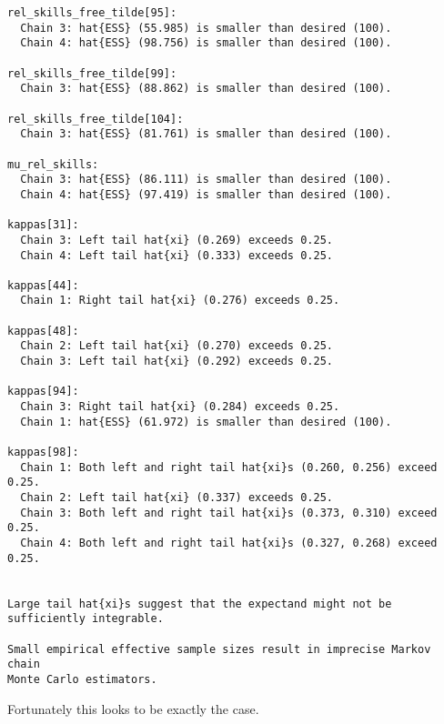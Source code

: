 \documentclass[
  letterpaper,
  DIV=11,
  numbers=noendperiod]{scrartcl}
\begin{document}
\begin{verbatim}
rel_skills_free_tilde[95]:
  Chain 3: hat{ESS} (55.985) is smaller than desired (100).
  Chain 4: hat{ESS} (98.756) is smaller than desired (100).

rel_skills_free_tilde[99]:
  Chain 3: hat{ESS} (88.862) is smaller than desired (100).

rel_skills_free_tilde[104]:
  Chain 3: hat{ESS} (81.761) is smaller than desired (100).

mu_rel_skills:
  Chain 3: hat{ESS} (86.111) is smaller than desired (100).
  Chain 4: hat{ESS} (97.419) is smaller than desired (100).

kappas[31]:
  Chain 3: Left tail hat{xi} (0.269) exceeds 0.25.
  Chain 4: Left tail hat{xi} (0.333) exceeds 0.25.

kappas[44]:
  Chain 1: Right tail hat{xi} (0.276) exceeds 0.25.

kappas[48]:
  Chain 2: Left tail hat{xi} (0.270) exceeds 0.25.
  Chain 3: Left tail hat{xi} (0.292) exceeds 0.25.

kappas[94]:
  Chain 3: Right tail hat{xi} (0.284) exceeds 0.25.
  Chain 1: hat{ESS} (61.972) is smaller than desired (100).

kappas[98]:
  Chain 1: Both left and right tail hat{xi}s (0.260, 0.256) exceed 0.25.
  Chain 2: Left tail hat{xi} (0.337) exceeds 0.25.
  Chain 3: Both left and right tail hat{xi}s (0.373, 0.310) exceed 0.25.
  Chain 4: Both left and right tail hat{xi}s (0.327, 0.268) exceed 0.25.


Large tail hat{xi}s suggest that the expectand might not be
sufficiently integrable.

Small empirical effective sample sizes result in imprecise Markov chain
Monte Carlo estimators.
\end{verbatim}

Fortunately this looks to be exactly the case.
\end{document}
